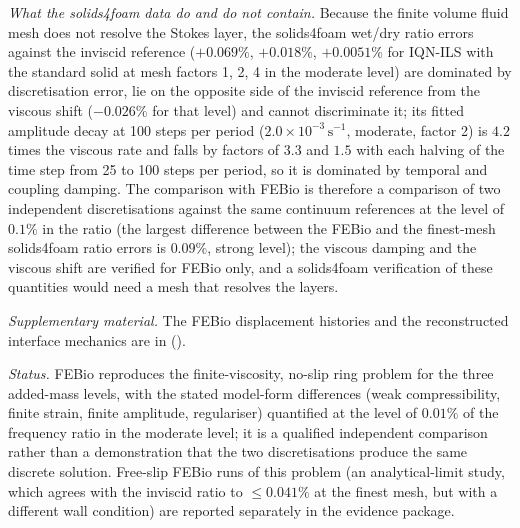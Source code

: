 \emph{What the solids4foam data do and do not contain.}
Because the finite volume fluid mesh does not resolve the Stokes layer, the solids4foam wet/dry ratio errors against the inviscid reference ($+0.069\%$, $+0.018\%$, $+0.0051\%$ for IQN-ILS with the standard solid at mesh factors 1, 2, 4 in the moderate level) are dominated by discretisation error, lie on the opposite side of the inviscid reference from the viscous shift ($-0.026\%$ for that level) and cannot discriminate it; its fitted amplitude decay at 100 steps per period ($2.0\times10^{-3}\,\mathrm{s^{-1}}$, moderate, factor 2) is $4.2$ times the viscous rate and falls by factors of $3.3$ and $1.5$ with each halving of the time step from 25 to 100 steps per period, so it is dominated by temporal and coupling damping.
The comparison with FEBio is therefore a comparison of two independent discretisations against the same continuum references at the level of $0.1\%$ in the ratio (the largest difference between the FEBio and the finest-mesh solids4foam ratio errors is $0.09\%$, strong level); the viscous damping and the viscous shift are verified for FEBio only, and a solids4foam verification of these quantities would need a mesh that resolves the layers.

\emph{Supplementary material.}
The FEBio displacement histories and the reconstructed interface mechanics are in \suppRef{} (\suppFigBoth).

\emph{Status.}
FEBio reproduces the finite-viscosity, no-slip ring problem for the three added-mass levels, with the stated model-form differences (weak compressibility, finite strain, finite amplitude, regulariser) quantified at the level of $0.01\%$ of the frequency ratio in the moderate level; it is a qualified independent comparison rather than a demonstration that the two discretisations produce the same discrete solution.
Free-slip FEBio runs of this problem (an analytical-limit study, which agrees with the inviscid ratio to $\leq0.041\%$ at the finest mesh, but with a different wall condition) are reported separately in the evidence package.

